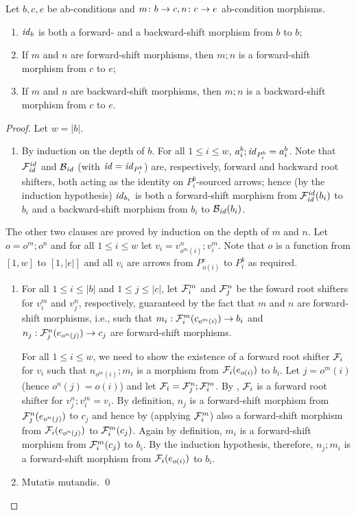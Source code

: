 \begin{lemma}
Let $b,c,e$ be ab-conditions and $m\colon b\rightarrow c, n\colon c\rightarrow e$ ab-condition morphisms.
\begin{enumerate}[topsep=\smallskipamount]
\item $\mathit{id}_b$ is both a forward- and a backward-shift morphism from $b$ to $b$;
\item If $m$ and $n$ are forward-shift morphisms, then $m;n$ is a forward-shift morphism from $c$ to $e$;
\item If $m$ and $n$ are backward-shift morphisms, then $m;n$ is a backward-shift morphism from $c$ to $e$.
\end{enumerate}
\end{lemma}
%
\begin{fullorname}
\begin{proof}
Let $w=|b|$.
%
\begin{enumerate}[topsep=\smallskipamount]
\item By induction on the depth of $b$. For all $1\leq i\leq w$, $a^b_i;\mathit{id}_{P^b_i}=a^b_i$. Note that $\mathcal{F}^{\mathit{id}}_{\mathit{id}}$ and $\mathcal{B}_{\mathit{id}}$ (with $\mathit{id}=\mathit{id}_{P^b_i}$) are, respectively, forward and backward root shifters, both acting as the identity on $P^b_i$-sourced arrows; hence (by the induction hypothesis) $\mathit{id}_{b_i}$ is both a forward-shift morphism from $\mathcal{F}^{\mathit{id}}_{\mathit{id}}(b_i)$ to $b_i$ and a backward-shift morphism from $b_i$ to $\mathcal{B}_{\mathit{id}}(b_i)$.
\end{enumerate}
%
The other two clauses are proved by induction on the depth of $m$ and $n$. Let $o=o^m;o^n$ and for all $1\leq i\leq w$ let $v_i=v^n_{o^m(i)};v^m_i$. Note that $o$ is a function from $[1,w]$ to $[1,|e|]$ and all $v_i$ are arrows from $P^e_{o(i)}$ to $P^b_i$ as required.
%
\begin{enumerate}[resume]
\item For all $1\leq i\leq |b|$ and $1\leq j\leq |c|$, let $\mathcal{F}^m_i$ and $\mathcal{F}^n_j$ be the foward root shifters for $v^m_i$ and $v^n_j$, respectively, guaranteed by the fact that $m$ and $n$ are forward-shift morphisms, i.e., such that $m_i:\mathcal{F}^m_i(c_{o^m(i)})\rightarrow b_i$ and $n_j:\mathcal{F}^n_j(e_{o^n(j)})\rightarrow c_j$ are forward-shift morphisms.

\smallskip
For all $1\leq i\leq w$, we need to show the existence of a forward root shifter $\mathcal{F}_i$ for $v_i$ such that $n_{o^m(i)};m_i$ is a morphism from $\mathcal{F}_i(e_{o(i)})$ to $b_i$. Let $j=o^m(i)$ (hence $o^n(j)=o(i)$) and let $\mathcal{F}_i=\mathcal{F}^n_j;\mathcal{F}^m_i$. By , $\mathcal{F}_i$ is a forward root shifter for $v^n_j;v^m_i=v_i$. By definition, $n_j$ is a forward-shift morphism from $\mathcal{F}^n_j(e_{o^n(j)})$ to $c_j$ and hence by  (applying $\mathcal{F}^m_i$) also a forward-shift morphism from $\mathcal{F}_i(e_{o^n(j)})$ to $\mathcal{F}^m_i(c_j)$. Again by definition, $m_i$ is a forward-shift morphism from $\mathcal{F}^m_i(c_j)$ to $b_i$. By the induction hypothesis, therefore, $n_j;m_i$ is a forward-shift morphism from $\mathcal{F}_i(e_{o(i)})$ to $b_i$.

\item Mutatis mutandis.
\qed
\end{enumerate}
\end{proof}
\end{fullorname}
